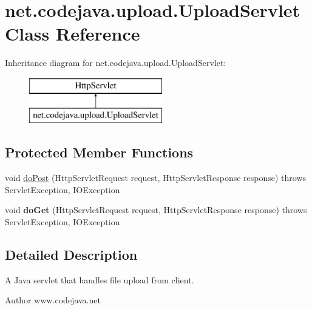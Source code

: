 \hypertarget{classnet_1_1codejava_1_1upload_1_1_upload_servlet}{\section{net.\+codejava.\+upload.\+Upload\+Servlet Class Reference}
\label{classnet_1_1codejava_1_1upload_1_1_upload_servlet}
}
Inheritance diagram for net.\+codejava.\+upload.\+Upload\+Servlet\+:\begin{figure}[H]
\begin{center}
\leavevmode
\includegraphics[height=2.000000cm]{classnet_1_1codejava_1_1upload_1_1_upload_servlet}
\end{center}
\end{figure}
\subsection*{Protected Member Functions}
\begin{DoxyCompactItemize}
\item 
void \hyperlink{classnet_1_1codejava_1_1upload_1_1_upload_servlet_a95856bc52ec04c942986ec54d22d5ded}{do\+Post} (Http\+Servlet\+Request request, Http\+Servlet\+Response response)  throws Servlet\+Exception, I\+O\+Exception 
\item 
\hypertarget{classnet_1_1codejava_1_1upload_1_1_upload_servlet_ac34cb6d5d4b238f63083d83837405f3d}{void {\bfseries do\+Get} (Http\+Servlet\+Request request, Http\+Servlet\+Response response)  throws Servlet\+Exception, I\+O\+Exception }\label{classnet_1_1codejava_1_1upload_1_1_upload_servlet_ac34cb6d5d4b238f63083d83837405f3d}

\end{DoxyCompactItemize}


\subsection{Detailed Description}
A Java servlet that handles file upload from client. \begin{DoxyAuthor}{Author}
www.\+codejava.\+net 
\end{DoxyAuthor}


